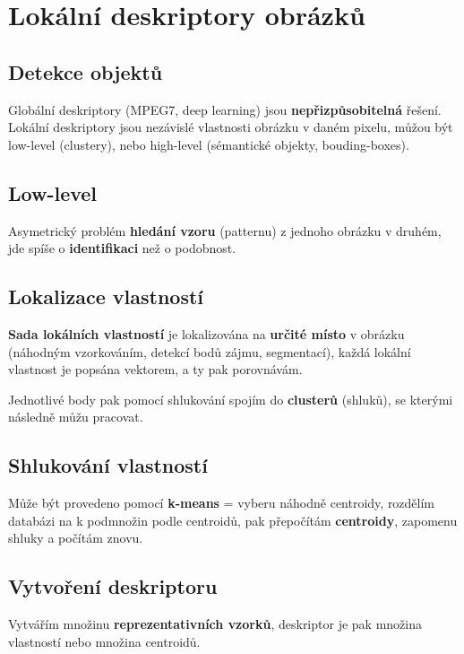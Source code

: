 \section{Lokální deskriptory obrázků}

\subsection{Detekce objektů}

Globální deskriptory (MPEG7, deep learning) jsou \textbf{nepřizpůsobitelná} řešení. Lokální deskriptory jsou nezávislé vlastnosti obrázku v daném pixelu, můžou být low-level (clustery), nebo high-level (sémantické objekty, bouding-boxes).

\subsection{Low-level}

Asymetrický problém \textbf{hledání vzoru} (patternu) z jednoho obrázku v druhém, jde spíše o \textbf{identifikaci} než o podobnost.

\subsection{Lokalizace vlastností}

\textbf{Sada lokálních vlastností} je lokalizována na \textbf{určité místo} v obrázku (náhodným vzorkováním, detekcí bodů zájmu, segmentací), každá lokální vlastnost je popsána vektorem, a ty pak porovnávám.

Jednotlivé body pak pomocí shlukování spojím do \textbf{clusterů} (shluků), se kterými následně můžu pracovat.

\subsection{Shlukování vlastností}

Může být provedeno pomocí \textbf{k-means} = vyberu náhodně centroidy, rozdělím databázi na k podmnožin podle centroidů, pak přepočítám \textbf{centroidy}, zapomenu shluky a počítám znovu.

\subsection{Vytvoření deskriptoru}

Vytvářím množinu \textbf{reprezentativních vzorků}, deskriptor je pak množina vlastností nebo množina centroidů.

